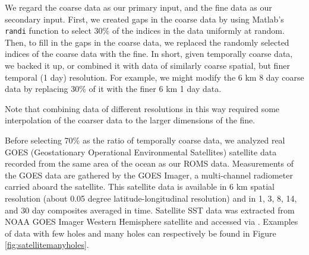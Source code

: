 \documentclass[11pt]{article}
\begin{document}
We regard the coarse data as our primary input, and the fine data as our secondary input. First, we created gaps in the coarse data by using Matlab’s \texttt{randi} function to select 30\% of the indices in the data uniformly at random. Then, to fill in the gaps in the coarse data, we replaced the randomly selected indices of the coarse data with the fine. In short, given temporally coarse data, we backed it up, or combined it with data of similarly coarse spatial, but finer temporal (1 day) resolution. For example, we might modify the 6 km 8 day coarse data by replacing 30\% of it with the finer 6 km 1 day data. \par 

Note that combining data of different resolutions in this way required some interpolation of the coarser data to the larger dimensions of the fine.\par

Before selecting 70\% as the ratio of temporally coarse data, we analyzed real GOES (Geostationary Operational Environmental Satellites) satellite data recorded from the same area of the ocean as our ROMS data. Measurements of the GOES data are gathered by the GOES Imager, a multi-channel radiometer carried aboard the satellite. This satellite data is available in 6 km spatial resolution (about 0.05 degree latitude-longitudinal resolution) and in 1, 3, 8, 14, and 30 day composites averaged in time. Satellite SST data was extracted from NOAA GOES Imager Western Hemisphere satellite and accessed via \cite{GOES}. Examples of data with few holes and many holes can respectively be found in Figure \ref{fig:satellitemanyholes}. \par
\end{document}
